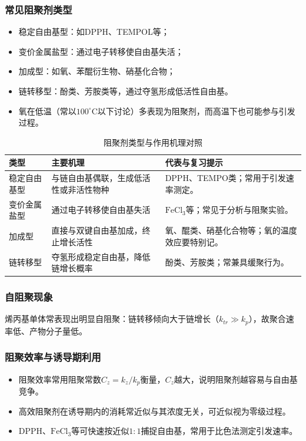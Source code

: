 ﻿\documentclass[12pt,a4paper]{article}
\renewcommand{\arraystretch}{1.18}
\begin{document}
\subsubsection{常见阻聚剂类型}
\begin{itemize}
  \item 稳定自由基型：如DPPH、TEMPOL等；
  \item 变价金属盐型：通过电子转移使自由基失活；
  \item 加成型：如氧、苯醌衍生物、硝基化合物；
  \item 链转移型：酚类、芳胺类等，通过夺氢形成低活性自由基。
  \item 氧在低温（常以$100^\circ\mathrm{C}$以下讨论）多表现为阻聚剂，而高温下也可能参与引发过程。
\end{itemize}
\begin{table}[!htbp]
  \centering
  \caption{阻聚剂类型与作用机理对照}
  {\small
  \setlength{\tabcolsep}{6pt}
  \renewcommand{\arraystretch}{1.2}
  \begin{tabularx}{\textwidth}{C{2.4cm}Y Y}
    \toprule
    \textbf{类型} & \textbf{主要机理} & \textbf{代表与复习提示} \\
    \midrule
    稳定自由基型 & 与链自由基偶联，生成低活性或非活性物种 & DPPH、TEMPO类；常用于引发速率测定。 \\
    变价金属盐型 & 通过电子转移使自由基失活 & $\mathrm{FeCl_3}$等；常见于分析与阻聚实验。 \\
    加成型 & 直接与双键自由基加成，终止增长活性 & 氧、醌类、硝基化合物等；氧的温度效应要特别记。 \\
    链转移型 & 夺氢形成稳定自由基，降低链增长概率 & 酚类、芳胺类；常兼具缓聚行为。 \\
    \bottomrule
  \end{tabularx}
  }
\end{table}

\subsubsection{自阻聚现象}
烯丙基单体常表现出明显自阻聚：链转移倾向大于链增长（$k_{tr}\gg k_p$），故聚合速率低、产物分子量低。

\subsubsection{阻聚效率与诱导期利用}
\begin{itemize}
  \item 阻聚效率常用阻聚常数$C_z=k_z/k_p$衡量，$C_z$越大，说明阻聚剂越容易与自由基竞争。
  \item 高效阻聚剂在诱导期内的消耗常近似与其浓度无关，可近似视为零级过程。
  \item DPPH、$\mathrm{FeCl_3}$等可快速按近似$1{:}1$捕捉自由基，常用于比色法测定引发速率。
\end{itemize}
\end{document}
